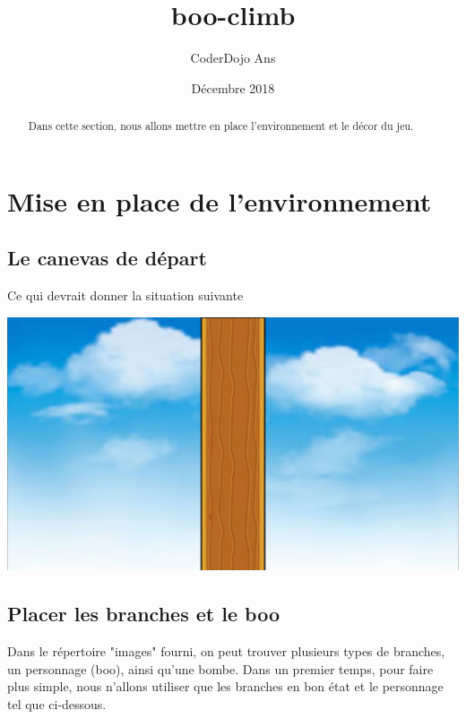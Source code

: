 \documentclass[french]{article}
\title{boo-climb}
\author{CoderDojo Ans}
\date{Décembre 2018}
\begin{document}
\begin{titlepage}
	\maketitle
\end{titlepage}

\tableofcontents{}
\newpage

\section{Mise en place de l'environnement}

\begin{abstract}
	Dans cette section, nous allons mettre en place l'environnement et le décor du jeu.
\end{abstract}
	
\subsection{Le canevas de départ}	



Ce qui devrait donner la situation suivante\\

\begin{center}
\includegraphics[scale=0.20]{step1}
\end{center}
	
\newpage
	
\subsection{Placer les branches et le boo}	
	
Dans le répertoire "images" fourni, on peut trouver plusieurs types de branches, un personnage (boo), ainsi qu'une bombe. Dans un premier temps, pour faire plus simple, nous n'allons utiliser que les branches en bon état et le personnage tel que ci-dessous.	
	
\end{document}
